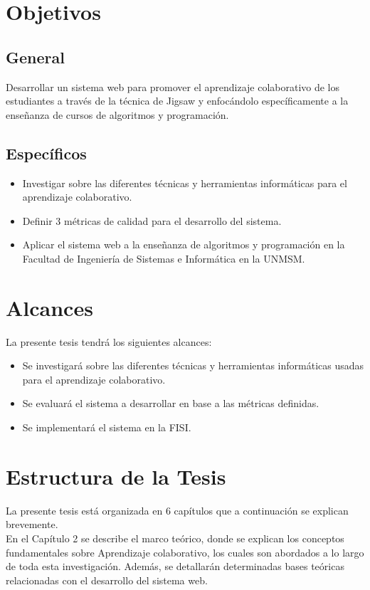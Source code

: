 \section{Objetivos}
\subsection{General}
Desarrollar un sistema web para promover el aprendizaje colaborativo de los estudiantes a través de la técnica de Jigsaw y enfocándolo específicamente a la enseñanza de cursos de algoritmos y programación.
\subsection{Específicos}
\begin{itemize}
  \item Investigar sobre las diferentes técnicas y herramientas informáticas para el aprendizaje colaborativo.
  \item Definir 3 métricas de calidad para el desarrollo del sistema.
  \item Aplicar el sistema web a la enseñanza de algoritmos y programación en la Facultad de Ingeniería de Sistemas e Informática en la UNMSM.
\end{itemize}

\section{Alcances}
La presente tesis tendrá los siguientes alcances:
\begin{itemize}
  \item Se investigará sobre las diferentes técnicas y herramientas informáticas usadas para el aprendizaje colaborativo.
  \item Se evaluará el sistema a desarrollar en base a las métricas definidas.
  \item Se implementará el sistema en la FISI.
\end{itemize}

\section{Estructura de la Tesis}
La presente tesis está organizada en 6 capítulos que a continuación se explican brevemente.\\

En el Capítulo 2 se describe el marco teórico, donde se explican los conceptos fundamentales sobre Aprendizaje colaborativo, los cuales son abordados a lo largo de toda esta investigación. Además, se detallarán determinadas bases teóricas relacionadas con el desarrollo del sistema web.\\

